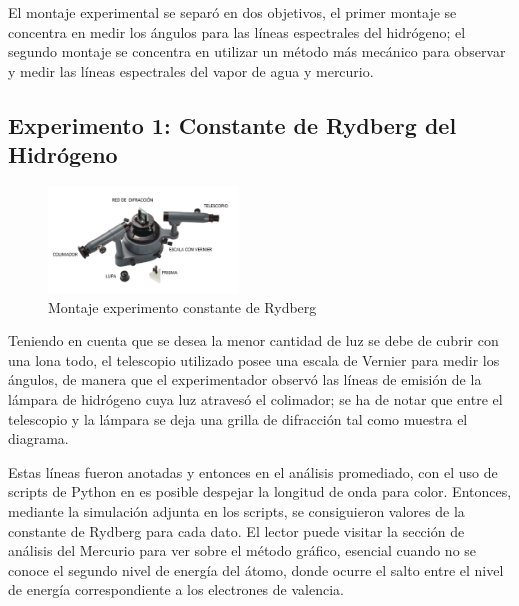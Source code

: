 \documentclass[a4paper,twocolumn,10pt]{article}
\begin{document}
El montaje experimental se separó en dos objetivos, el primer montaje se concentra en medir los ángulos para las líneas espectrales del hidrógeno; el segundo montaje se concentra en utilizar un método más mecánico para observar y medir las líneas espectrales del vapor de agua y mercurio.

\subsection{Experimento 1: Constante de Rydberg del Hidrógeno}
\begin{figure}[H]
    \centering
    \includegraphics[width=0.45\textwidth]{Imagenes/Rydberg/experimentolabrydberg.png}
    \caption{Montaje experimento constante de Rydberg}
    \label{fig:montajeHidrogeno}
\end{figure}

Teniendo en cuenta que se desea la menor cantidad de luz se debe de cubrir con una lona todo, el telescopio utilizado posee una escala de Vernier para medir los ángulos, de manera que el experimentador observó las líneas de emisión de la lámpara de hidrógeno cuya luz atravesó el colimador; se ha de notar que entre el telescopio y la lámpara se deja una grilla de difracción tal como muestra el diagrama.

Estas líneas fueron anotadas y entonces en el análisis promediado, con el uso de scripts de Python en \cite{github} es posible despejar la longitud de onda para color. Entonces, mediante la simulación adjunta en los scripts, se consiguieron valores de la constante de Rydberg para cada dato. El lector puede visitar la sección de análisis del Mercurio para ver sobre el método gráfico, esencial cuando no se conoce el segundo nivel de energía del átomo, donde ocurre el salto entre el nivel de energía correspondiente a los electrones de valencia.
\end{document}

